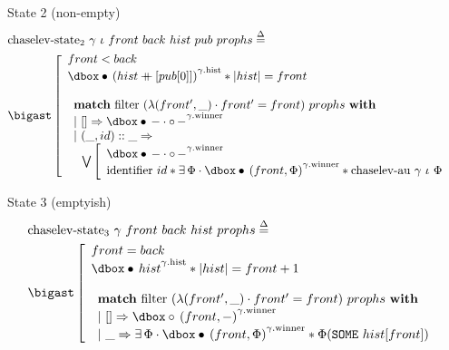 \begin{frame}{State 2 (non-empty)}
\small
\begin{align*}
		&\mathrm{chaselev \mathhyphen state_2}\ \gamma\ \iota\ front\ back\ hist\ pub\ prophs
		\eqdef
	\\
		&\iBigsep\left[\begin{array}{l}
				front < back
			\\
				\iGhost{\gamma\mathrm{.hist}}{\iAuth{(hist \mdoubleplus [pub [0]])}} \iSep
				| hist | = front
			\\\\
				\begin{array}{l}
						\bold{match}\ \mathrm{filter}\ (\lambda (front', \_) \cdot front' = front)\ prophs\ \bold{with}
					\\
						|\ [] \Rightarrow
						\iGhost{\gamma\mathrm{.winner}}{\iAuth{-} \cdot \iFrag{-}}
					\\
						|\ (\_, id) :: \_ \Rightarrow
					\\
						\ \ 
						\bigvee\left[\begin{array}{l}
								\iGhost{\gamma\mathrm{.winner}}{\iAuth{-} \cdot \iFrag{-}}
							\\
								\mathrm{identifier}\ id \iSep
								\exists \Phi \cdot
								\iGhost{\gamma\mathrm{.winner}}{\iAuth{(front, \Phi)}} \iSep
								\mathrm{chaselev \mathhyphen au}\ \gamma\ \iota\ \Phi
						\end{array}\right.
				\end{array}
		\end{array}\right.
\end{align*}
\end{frame}


\begin{frame}{State 3 (emptyish)}
\small
\begin{align*}
		&\mathrm{chaselev \mathhyphen state_3}\ \gamma\ front\ back\ hist\ prophs
		\eqdef
	\\
		&\iBigsep\left[\begin{array}{l}
				front = back
			\\
				\iGhost{\gamma\mathrm{.hist}}{\iAuth{hist}} \iSep
				| hist | = front + 1
			\\\\
				\begin{array}{l}
						\bold{match}\ \mathrm{filter}\ (\lambda (front', \_) \cdot front' = front)\ prophs\ \bold{with}
					\\
						|\ [] \Rightarrow
						\iGhost{\gamma\mathrm{.winner}}{\iFrag{(front, -)}}
					\\
						|\ \_ \Rightarrow
						\exists \Phi \cdot
						\iGhost{\gamma\mathrm{.winner}}{\iAuth{(front, \Phi)}} \iSep
						\Phi (\exprSome{hist [front]})
				\end{array}
		\end{array}\right.
\end{align*}
\end{frame}

